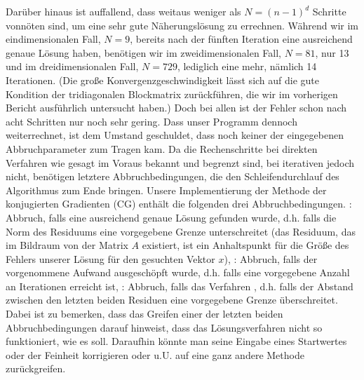 \documentclass{scrartcl}
\begin{document}
Darüber hinaus ist auffallend, dass weitaus weniger als $N=(n-1)^d$ Schritte vonnöten sind, um eine sehr gute Näherungslösung zu errechnen. 
Während wir im eindimensionalen Fall, $N=9$, bereits nach der fünften Iteration eine ausreichend genaue Lösung haben, benötigen wir im zweidimensionalen Fall, $N=81$, nur 13 und im dreidimensionalen Fall, $N=729$, lediglich eine mehr, nämlich 14 Iterationen.  
(Die große Konvergenzgeschwindigkeit lässt sich auf die gute Kondition der tridiagonalen Blockmatrix zurückführen, die wir im vorherigen Bericht ausführlich untersucht haben.) 
Doch bei allen ist der Fehler schon nach acht Schritten nur noch sehr gering. 
Dass unser Programm dennoch weiterrechnet, ist dem Umstand geschuldet, dass noch keiner der eingegebenen Abbruchparameter zum Tragen kam. 
Da die Rechenschritte bei direkten Verfahren wie gesagt im Voraus bekannt und begrenzt sind, bei iterativen jedoch nicht, benötigen letztere Abbruchbedingungen, die den Schleifendurchlauf des Algorithmus zum Ende bringen. 
Unsere Implementierung der Methode der konjugierten Gradienten (CG) enthält die folgenden drei Abbruchbedingungen. 
\grqq: Abbruch, falls eine ausreichend genaue Lösung gefunden wurde, d.h. falls die Norm des Residuums eine vorgegebene Grenze unterschreitet (das Residuum, das im Bildraum von der Matrix $A$ existiert, ist ein Anhaltspunkt für die Größe des Fehlers unserer Lösung für den gesuchten Vektor $x$), \grqq: Abbruch, falls der vorgenommene Aufwand ausgeschöpft wurde, d.h. falls eine vorgegebene Anzahl an Iterationen erreicht ist, \grqq: Abbruch, falls das Verfahren \grqq, d.h. falls der Abstand zwischen den letzten beiden Residuen eine vorgegebene Grenze überschreitet. 
Dabei ist zu bemerken, dass das Greifen einer der letzten beiden Abbruchbedingungen darauf hinweist, dass das Lösungsverfahren nicht so funktioniert, wie es soll. 
Daraufhin könnte man seine Eingabe eines Startwertes oder der Feinheit korrigieren oder u.U. auf eine ganz andere Methode zurückgreifen. 
\end{document}
